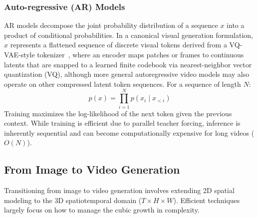 \documentclass[lettersize,journal]{IEEEtran}
\begin{document}

\subsubsection{Auto-regressive (AR) Models}
AR models decompose the joint probability distribution of a sequence $x$ into a product of conditional probabilities. In a canonical visual generation formulation, $x$ represents a flattened sequence of discrete visual tokens derived from a VQ-VAE-style tokenizer~\cite{esser2021taming}, where an encoder maps patches or frames to continuous latents that are snapped to a learned finite codebook via nearest-neighbor vector quantization (VQ), although more general autoregressive video models may also operate on other compressed latent token sequences. For a sequence of length $N$:
\begin{equation}
p(x) = \prod_{i=1}^{N} p(x_i \mid x_{<i})
\end{equation}
Training maximizes the log-likelihood of the next token given the previous context. While training is efficient due to parallel teacher forcing, inference is inherently sequential and can become computationally expensive for long videos ($O(N)$). 

\subsection{From Image to Video Generation}
Transitioning from image to video generation involves extending 2D spatial modeling to the 3D spatiotemporal domain ($T \times H \times W$). Efficient techniques largely focus on how to manage the cubic growth in complexity.
\end{document}
